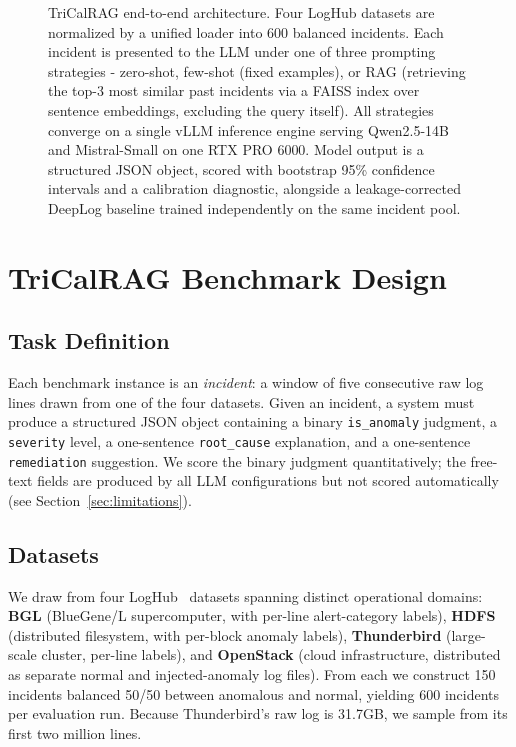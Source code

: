 \documentclass[10pt,conference]{IEEEtran}
\begin{document}
\begin{figure}[t]
\begin{tikzpicture}
\end{tikzpicture}
\caption{TriCalRAG end-to-end architecture. Four LogHub datasets are normalized by a unified loader into 600 balanced incidents. Each incident is presented to the LLM under one of three prompting strategies - zero-shot, few-shot (fixed examples), or RAG (retrieving the top-3 most similar past incidents via a FAISS index over sentence embeddings, excluding the query itself). All strategies converge on a single vLLM inference engine serving Qwen2.5-14B and Mistral-Small on one RTX PRO 6000. Model output is a structured JSON object, scored with bootstrap 95\% confidence intervals and a calibration diagnostic, alongside a leakage-corrected DeepLog baseline trained independently on the same incident pool.}
\label{fig:tricalrag}
\end{figure}

\section{TriCalRAG Benchmark Design}

\subsection{Task Definition}
Each benchmark instance is an \emph{incident}: a window of five
consecutive raw log lines drawn from one of the four datasets. Given an
incident, a system must produce a structured JSON object containing a
binary \texttt{is\_anomaly} judgment, a \texttt{severity} level, a
one-sentence \texttt{root\_cause} explanation, and a one-sentence
\texttt{remediation} suggestion. We score the binary judgment
quantitatively; the free-text fields are produced by all LLM
configurations but not scored automatically (see
Section~\ref{sec:limitations}).

\subsection{Datasets}
We draw from four LogHub~\cite{loghub} datasets spanning distinct
operational domains: \textbf{BGL} (BlueGene/L supercomputer, with
per-line alert-category labels), \textbf{HDFS} (distributed filesystem,
with per-block anomaly labels), \textbf{Thunderbird} (large-scale
cluster, per-line labels), and \textbf{OpenStack} (cloud infrastructure,
distributed as separate normal and injected-anomaly log files). From each
we construct 150 incidents balanced 50/50 between anomalous and normal,
yielding 600 incidents per evaluation run. Because Thunderbird's raw log
is 31.7GB, we sample from its first two million lines.
\end{document}
